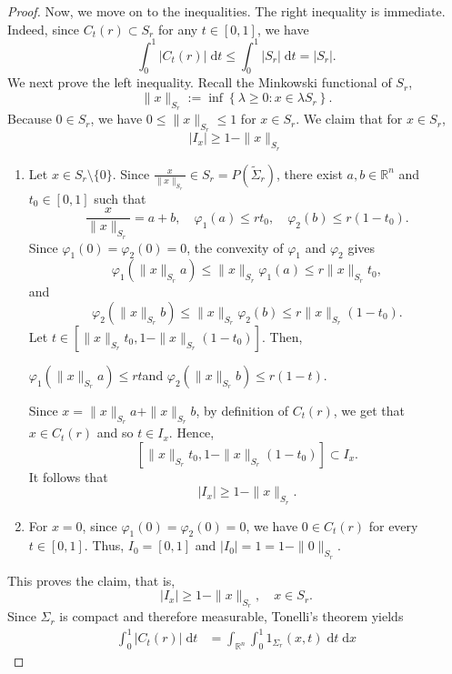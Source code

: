 \documentclass[11pt]{amsart}
\newcommand{\R}{{\mathbb R}}
\theoremstyle{plain}
\theoremstyle{definition}
\theoremstyle{remark}
\begin{document}
\begin{proof}
    Now, we move on to the inequalities. The right inequality is immediate. Indeed, since $C_t(r) \subset S_r$ for any $t \in [0,1]$, we have
    \[
        \int_0^1\left|C_t(r)\right| \;\mathrm d t
        \leq
        \int_0^1\left|S_r\right| \;\mathrm d t
        =
        \left|S_r\right|.
    \]
    We next prove the left inequality. Recall the Minkowski functional of $S_r$,
    $$
    \|x\|_{S_r}:=\inf \left\{\lambda \geq 0: x \in \lambda S_r\right\}.
    $$
    Because $0 \in S_r$, we have $0 \leq \|x\|_{S_r} \leq 1$ for $x \in S_r$. We claim that for $x \in S_r$,
    \[
        |I_x| \geq 1-\|x\|_{S_r}
    \]
   \begin{enumerate}[wide =0pt, labelwidth= .9cm, leftmargin=1.55cm, label=\textbf{Case \arabic*}:]
        \item Let $x \in S_r \setminus\{0\}$. Since  $\frac{x}{\|x\|_{S_r}} \in S_r = P\left(\widetilde{\Sigma}_r\right)$, there exist $a,b \in \R^n$ and $t_0 \in [0,1]$ such that
    \[
        \frac{x}{\|x\|_{S_r}}=a+b, \quad \varphi_1(a) \leq r t_0, \quad \varphi_2(b) \leq r\left(1-t_0\right).
    \]
    Since $\varphi_1(0)=\varphi_2(0)=0$, the convexity of $\varphi_1$ and $\varphi_2$ gives
    $$
    \varphi_1(\|x\|_{S_r} a) \leq \|x\|_{S_r} \varphi_1(a) \leq r \|x\|_{S_r} t_0
    , $$
    and
    $$
    \varphi_2(\|x\|_{S_r} b) \leq \|x\|_{S_r} \varphi_2(b) \leq r \|x\|_{S_r}\left(1-t_0\right) .
    $$
    Let $t \in\left[\|x\|_{S_r} t_0, 1-\|x\|_{S_r}\left(1-t_0\right)\right]$. Then,
    \begin{center}
        $\varphi_1(\|x\|_{S_r} a) \leq rt$\quad and \quad$ \varphi_2(\|x\|_{S_r} b) \leq r \left(1-t\right)$.
    \end{center}
    Since $x = \|x\|_{S_r}a+\|x\|_{S_r}b$, by definition of $C_t(r)$, we get that $x \in C_t(r)$ and so $t \in I_x$. Hence,
    \[
        \left[\|x\|_{S_r} t_0, 1-\|x\|_{S_r}\left(1-t_0\right)\right] \subset I_x.
    \]
    It follows that
    \[
        |I_x| \geq 1-\|x\|_{S_r}.
    \]
    \item For $x=0$, since $\varphi_1(0)=\varphi_2(0)=0$, we have $0 \in C_t(r)$ for every $t \in[0,1]$. Thus,
$
I_0=[0,1]
$
and
$
\left|I_0\right|=1=1-\|0\|_{S_r} .
$
    \end{enumerate}
This proves the claim, that is,
$$
\left|I_x\right| \geq 1-\|x\|_{S_r}, \quad x \in S_r.
$$
Since $\Sigma_r$ is compact and therefore measurable, Tonelli's theorem yields
$$
\begin{aligned}
\int_0^1\left|C_t(r)\right|  \;\mathrm{d} t
& =\int_{\mathbb{R}^n} \int_0^1 {1}_{\Sigma_r}(x, t) \;\mathrm{d} t \;\mathrm{d} x

\end{aligned}$$
\end{proof}
\end{document}
